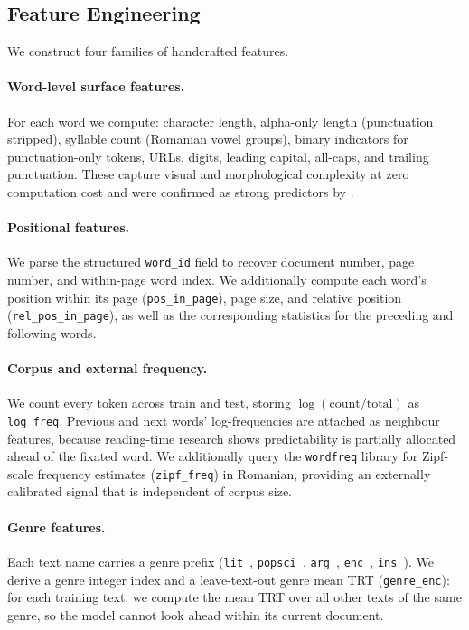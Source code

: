 \documentclass[12pt]{article}
\begin{document}
\subsection{Feature Engineering}
\label{sec:features}

We construct four families of handcrafted features.

\paragraph{Word-level surface features.}
For each word we compute: character length, alpha-only length (punctuation stripped), syllable count (Romanian vowel groups), binary indicators for punctuation-only tokens, URLs, digits, leading capital, all-caps, and trailing punctuation. These capture visual and morphological complexity at zero computation cost and were confirmed as strong predictors by \citet{hodivoianu2025predicting}.

\paragraph{Positional features.}
We parse the structured \texttt{word\_id} field to recover document number, page number, and within-page word index. We additionally compute each word's position within its page (\texttt{pos\_in\_page}), page size, and relative position (\texttt{rel\_pos\_in\_page}), as well as the corresponding statistics for the preceding and following words.

\paragraph{Corpus and external frequency.}
We count every token across train and test, storing $\log(\text{count} / \text{total})$ as \texttt{log\_freq}. Previous and next words' log-frequencies are attached as neighbour features, because reading-time research shows predictability is partially allocated ahead of the fixated word. We additionally query the \texttt{wordfreq} library \cite{speer2022wordfreq} for Zipf-scale frequency estimates (\texttt{zipf\_freq}) in Romanian, providing an externally calibrated signal that is independent of corpus size.

\paragraph{Genre features.}
Each text name carries a genre prefix (\texttt{lit\_}, \texttt{popsci\_}, \texttt{arg\_}, \texttt{enc\_}, \texttt{ins\_}). We derive a genre integer index and a leave-text-out genre mean TRT (\texttt{genre\_enc}): for each training text, we compute the mean TRT over all other texts of the same genre, so the model cannot look ahead within its current document.
\end{document}

